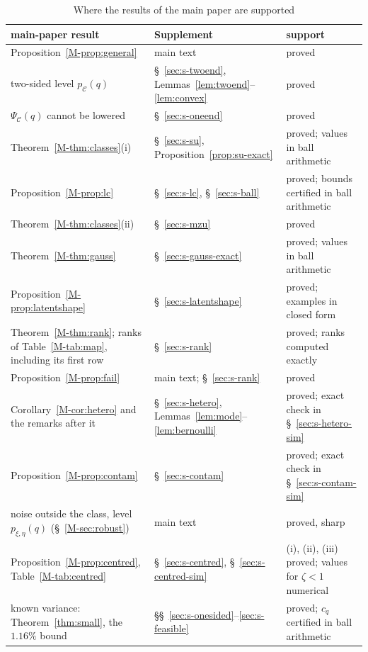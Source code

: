 \documentclass[12pt]{article}
\renewcommand{\_}{\usc\allowbreak}
\theoremstyle{definition}
\numberwithin{equation}{section}
\newcommand{\E}{\mathcal{C}}
\begin{document}
\begin{table}[!h]
\renewcommand{\baselinestretch}{1}
\caption{Where the results of the main paper are supported}
\label{tab:s-roadmap}
\centering
\fontsize{9}{11pt}\selectfont
\begin{tabular}{p{4.9cm}p{3.2cm}p{3.8cm}}
\toprule
main-paper result & Supplement & support \\
\midrule
Proposition~\ref{M-prop:general} & main text & proved \\
two-sided level $p_{\E}(q)$ & \S~\ref{sec:s-twoend}, Lemmas~\ref{lem:twoend}--\ref{lem:convex} & proved \\
$\Psi_{\E}(q)$ cannot be lowered & \S~\ref{sec:s-oneend} & proved \\
Theorem~\ref{M-thm:classes}(i) & \S~\ref{sec:s-su}, Proposition~\ref{prop:su-exact} & proved; values in ball arithmetic \\
Proposition~\ref{M-prop:lc} & \S~\ref{sec:s-lc}, \S~\ref{sec:s-ball} & proved; bounds certified in ball arithmetic \\
Theorem~\ref{M-thm:classes}(ii) & \S~\ref{sec:s-mzu} & proved \\
Theorem~\ref{M-thm:gauss} & \S~\ref{sec:s-gauss-exact} & proved; values in ball arithmetic \\
Proposition~\ref{M-prop:latentshape} & \S~\ref{sec:s-latentshape} & proved; examples in closed form \\
Theorem~\ref{M-thm:rank}; ranks of Table~\ref{M-tab:map}, including its first row & \S~\ref{sec:s-rank} & proved; ranks computed exactly \\
Proposition~\ref{M-prop:fail} & main text; \S~\ref{sec:s-rank} & proved \\
Corollary~\ref{M-cor:hetero} and the remarks after it & \S~\ref{sec:s-hetero}, Lemmas~\ref{lem:mode}--\ref{lem:bernoulli} & proved; exact check in \S~\ref{sec:s-hetero-sim} \\
Proposition~\ref{M-prop:contam} & \S~\ref{sec:s-contam} & proved; exact check in \S~\ref{sec:s-contam-sim} \\
noise outside the class, level $p_{\xi,\eta}(q)$ (\S~\ref{M-sec:robust}) & main text & proved, sharp \\
Proposition~\ref{M-prop:centred}, Table~\ref{M-tab:centred} & \S~\ref{sec:s-centred}, \S~\ref{sec:s-centred-sim} & (i), (ii), (iii) proved; values for $\zeta < 1$ numerical \\
known variance: Theorem~\ref{thm:small}, the $1.16\%$ bound & \S\S~\ref{sec:s-onesided}--\ref{sec:s-feasible} & proved; $c_q$ certified in ball arithmetic \\

\end{tabular}
\end{table}
\end{document}
